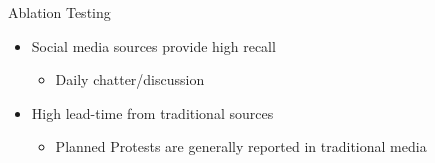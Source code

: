 \begin{frame}{Ablation Testing}

\begin{table}
\end{table}

\pause
\begin{itemize}
    \item Social media sources provide high recall \pause
        \begin{itemize} 
            \item Daily chatter/discussion 
        \end{itemize}
    \item High lead-time from traditional sources \pause
        \begin{itemize}
            \item Planned Protests are generally reported in traditional media
        \end{itemize}
\end{itemize}
\end{frame}



